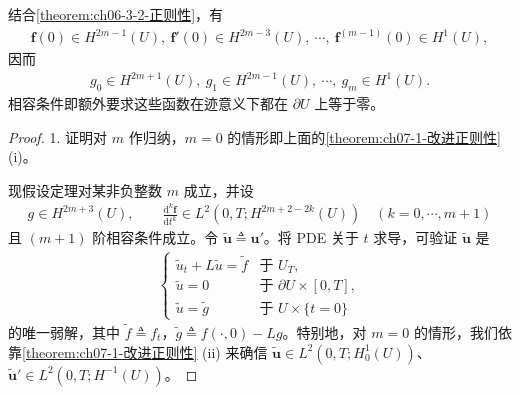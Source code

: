 \documentclass[../../main.tex]{subfiles}
\begin{document}
\begin{remark}\label{remark:ch07-1-相容条件的迹意义}
结合\cref{theorem:ch06-3-2-正则性}，有
\begin{align*}
\mathbf{f}(0)\in H^{2m-1}(U),\ \mathbf{f}'(0)\in H^{2m-3}(U),\ \cdots,\ \mathbf{f}^{(m-1)}(0)\in H^1(U),
\end{align*}
因而
\begin{align*}
g_0\in H^{2m+1}(U),\ g_1\in H^{2m-1}(U),\ \cdots,\ g_m\in H^1(U).
\end{align*}
相容条件即额外要求这些函数在迹意义下都在 $\partial U$ 上等于零。
\end{remark}

\begin{proof}
1. 证明对 $m$ 作归纳，$m=0$ 的情形即上面的\cref{theorem:ch07-1-改进正则性} (i)。

现假设定理对某非负整数 $m$ 成立，并设
\begin{align}
g\in H^{2m+3}(U),\qquad \frac{\mathrm{d}^k\mathbf{f}}{\mathrm{d}t^k}\in L^2(0,T;H^{2m+2-2k}(U))\quad (k=0,\cdots,m+1)\label{align:ch07-1-eq56}
\end{align}
且 $(m+1)$ 阶相容条件成立。令 $\widetilde{\mathbf{u}}\triangleq\mathbf{u}'$。将 PDE 关于 $t$ 求导，可验证 $\widetilde{\mathbf{u}}$ 是
\begin{align}
\begin{cases}
\widetilde{u}_t+L\widetilde{u}=\widetilde{f} & \text{于 } U_T,\\
\widetilde{u}=0 & \text{于 } \partial U\times[0,T],\\
\widetilde{u}=\widetilde{g} & \text{于 } U\times\{t=0\}
\end{cases}\label{align:ch07-1-eq57}
\end{align}
的唯一弱解，其中 $\widetilde{f}\triangleq f_t$，$\widetilde{g}\triangleq f(\cdot,0)-Lg$。特别地，对 $m=0$ 的情形，我们依靠\cref{theorem:ch07-1-改进正则性} (ii) 来确信 $\widetilde{\mathbf{u}}\in L^2(0,T;H^1_0(U))$、$\widetilde{\mathbf{u}}'\in L^2(0,T;H^{-1}(U))$。


\end{proof}
\end{document}
